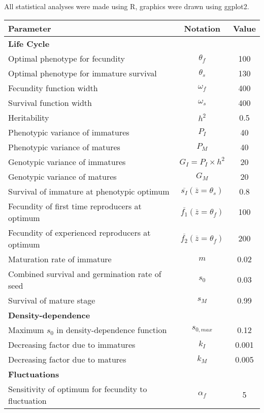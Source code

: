 All statistical analyses were made using R, graphics were drawn using ggplot2.

\begin{table}
\begin{center}
	\begin{tabular}{l c c}
		\hline \hline
		Parameter & Notation & Value \\
		\hline
		\multicolumn{3}{l}{\textbf{Life Cycle}} \\
		Optimal phenotype for fecundity & $\theta_{f}$ & 100 \\
		Optimal phenotype for immature survival & $\theta_{s}$ & 130 \\
		Fecundity function width & $\omega_{f}$ & 400 \\
		Survival function width & $\omega_{s}$ & 400 \\
		Heritability & $h^2$ & 0.5 \\
		Phenotypic variance of immatures & $P_{I}$ & 40 \\
		Phenotypic variance of matures & $P_{M}$ & 40 \\
		Genotypic variance of immatures & $G_{I} = P_{I} \times h^2$ & 20 \\
		Genotypic variance of matures & $G_{M}$ & 20 \\
		Survival of immature at phenotypic optimum & $\overline{s_{I}}(\overline{z} = \theta_{s})$ & 0.8 \\
		Fecundity of first time reproducers at optimum & $\overline{f_{1}}(\overline{z} = \theta_{f})$ & 100 \\
		Fecundity of experienced reproducers at optimum & $\overline{f_{2}}(\overline{z} = \theta_{f})$ & 200 \\
		Maturation rate of immature & $m$ & 0.02 \\
		Combined survival and germination rate of seed & $s_{0}$ & 0.03 \\
		Survival of mature stage & $s_{M}$ & 0.99 \\
		\multicolumn{3}{l}{\textbf{Density-dependence}} \\
		Maximum $s_{0}$ in density-dependence function & $s_{0, max}$ & 0.12 \\
		Decreasing factor due to immatures & $k_{I}$ & 0.001 \\
		Decreasing factor due to matures & $k_{M}$ & 0.005 \\
		\multicolumn{3}{l}{\textbf{Fluctuations}} \\
		Sensitivity of optimum for fecundity to fluctuation & $\alpha_{f}$ & 5 \\

\end{tabular}
\end{center}
\end{table}
